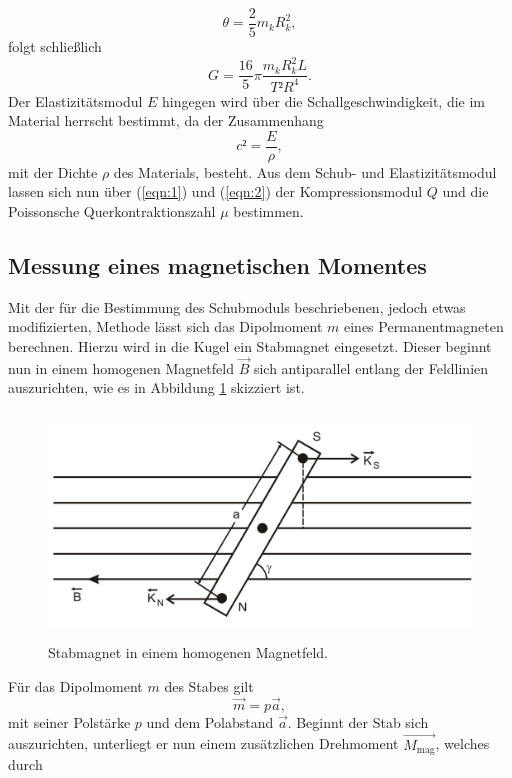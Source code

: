 \begin{equation}
  \theta = \frac{2}{5}m_k R_k^2, \label{eqn:7}
\end{equation}
folgt schließlich
\begin{equation}
  G = \frac{16}{5}\pi\frac{m_k R_k^2 L}{T²R^4}. \label{eqn:8}
\end{equation}
Der Elastizitätsmodul $E$ hingegen wird über die Schallgeschwindigkeit, die im Material herrscht bestimmt, da der Zusammenhang
\begin{equation}
  c² = \frac{E}{\rho},
\end{equation}
mit der Dichte $\rho$ des Materials, besteht.
Aus dem Schub- und Elastizitätsmodul lassen sich nun über (\ref{eqn:1}) und (\ref{eqn:2}) der Kompressionsmodul $Q$ und die Poissonsche Querkontraktionszahl $\mu$ bestimmen.
\subsection{Messung eines magnetischen Momentes}
Mit der für die Bestimmung des Schubmoduls beschriebenen, jedoch etwas modifizierten, Methode lässt sich das Dipolmoment $m$ eines Permanentmagneten berechnen.
Hierzu wird in die Kugel ein Stabmagnet eingesetzt.
Dieser beginnt nun in einem homogenen Magnetfeld $\vec{B}$ sich antiparallel entlang der Feldlinien auszurichten, wie es in Abbildung \ref{fig:4} skizziert ist.
\begin{figure}[H]
  \centering
  \includegraphics[height=6cm]{magnet.png}
  \caption{Stabmagnet in einem homogenen Magnetfeld. \cite{sample}}
  \label{fig:4}
\end{figure}
Für das Dipolmoment $m$ des Stabes gilt
\begin{equation}
  \vec{m} = p\vec{a}, \label{eqn:9}
\end{equation}
mit seiner Polstärke $p$ und dem Polabstand $\vec{a}$.
Beginnt der Stab sich auszurichten, unterliegt er nun einem zusätzlichen Drehmoment $\vec{M_{\text{mag}}}$, welches durch
